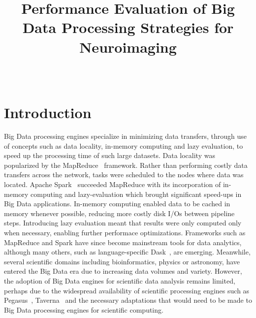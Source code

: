 \documentclass{IEEEtran}
\begin{document}
\title{Performance Evaluation of Big Data Processing Strategies for Neuroimaging}

\author{
  \\
}

\maketitle

\begin{abstract}
  
\end{abstract}


\section{Introduction} %

Big Data processing engines specialize in minimizing data transfers, through 
use of concepts such as data locality, in-memory computing and lazy evaluation,
to speed up the processing time of such large datasets.
Data locality was popularized by the 
MapReduce~\cite{dean2008mapreduce} framework. Rather than performing costly 
data transfers across the network, tasks were scheduled to the nodes where data
was located. Apache Spark~\cite{zaharia2016apache} succeeded MapReduce with its
incorporation of in-memory computing and lazy-evaluation which brought 
significant speed-ups in Big Data applications. In-memory computing
enabled data to be cached in memory whenever possible, reducing more costly
disk I/Os between pipeline steps. Introducing lazy
evaluation meant that results were only
computed only when necessary, enabling further performace optimizations. 
Frameworks such as
MapReduce and Spark have since become mainstream tools for data analytics, 
although many others, such as language-specific 
Dask~\cite{rocklin2015dask}, are emerging. 
Meanwhile, several scientific 
domains including bioinformatics, physics or astronomy, have entered 
the Big Data era due to increasing data volumes and variety. 
However, the adoption of Big Data engines for scientific data analysis 
remains limited, perhaps due to the widespread availability of 
scientific processing engines such as Pegasus~\cite{deelman2005pegasus}, 
Taverna~\cite{oinn2004taverna} and the necessary adaptations that would need to
be made to Big Data processing engines for scientific computing. 
\end{document}
